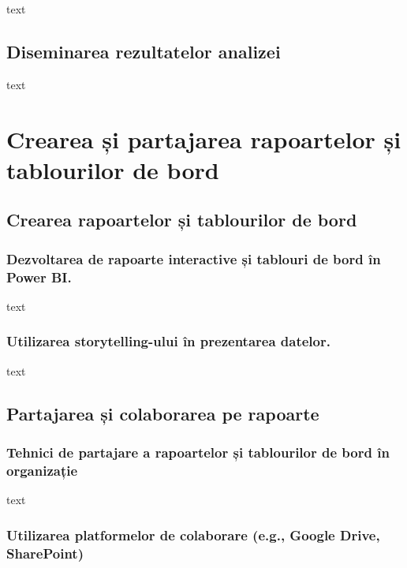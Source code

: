 \documentclass[
  11pt,
  b5paper,
  nottoc]{book}
\begin{document}
text

\section{Diseminarea rezultatelor
analizei}\label{diseminarea-rezultatelor-analizei}

text


\chapter{Crearea și partajarea rapoartelor și tablourilor de
bord}\label{cap6}

\section{Crearea rapoartelor și tablourilor de
bord}\label{crearea-rapoartelor-ux219i-tablourilor-de-bord}

\subsection{Dezvoltarea de rapoarte interactive și tablouri de bord în
Power
BI.}\label{dezvoltarea-de-rapoarte-interactive-ux219i-tablouri-de-bord-uxeen-power-bi.}

text

\subsection{Utilizarea storytelling-ului în prezentarea
datelor.}\label{utilizarea-storytelling-ului-uxeen-prezentarea-datelor.}

text

\section{Partajarea și colaborarea pe
rapoarte}\label{partajarea-ux219i-colaborarea-pe-rapoarte}

\subsection{Tehnici de partajare a rapoartelor și tablourilor de bord în
organizație}\label{tehnici-de-partajare-a-rapoartelor-ux219i-tablourilor-de-bord-uxeen-organizaux21bie}

text

\subsection{Utilizarea platformelor de colaborare (e.g., Google Drive,
SharePoint)}\label{utilizarea-platformelor-de-colaborare-e.g.-google-drive-sharepoint}
\end{document}
